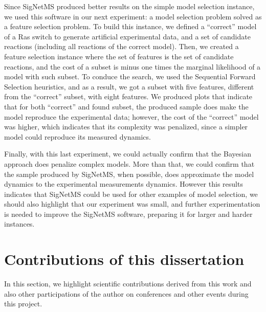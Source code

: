 Since SigNetMS produced better results on the simple model selection
instance, we used this software in our next experiment: a model
selection problem solved as a feature selection problem. To build this
instance, we defined a ``correct'' model of a Ras switch to generate
artificial experimental data, and a set of candidate reactions
(including all reactions of the correct model). Then, we created a
feature selection instance where the set of features is the set of
candidate reactions, and the cost of a subset is minus one times the
marginal likelihood of a model with such subset. To conduce the search,
we used the Sequential Forward Selection heuristics, and as a result, we
got a subset with five features, different from the ``correct'' subset,
with eight features. We produced plots that indicate that for both
``correct'' and found subset, the produced sample does make the model
reproduce the experimental data; however, the cost of the ``correct''
model was higher, which indicates that its complexity was penalized,
since a simpler model could reproduce its measured dynamics.

Finally, with this last experiment, we could actually confirm that the
Bayesian approach does penalize complex models. More than that, we could
confirm that the sample produced by SigNetMS, when possible, does
approximate the model dynamics to the experimental measurements
dynamics. However this results indicates that SigNetMS could be used for
other examples of model selection, we should also highlight that our
experiment was small, and further experimentation is needed to improve
the SigNetMS software, preparing it for larger and harder instances.

\section{Contributions of this dissertation}
In this section, we highlight scientific contributions derived from this
work and also other participations of the author on conferences and
other events during this project.

